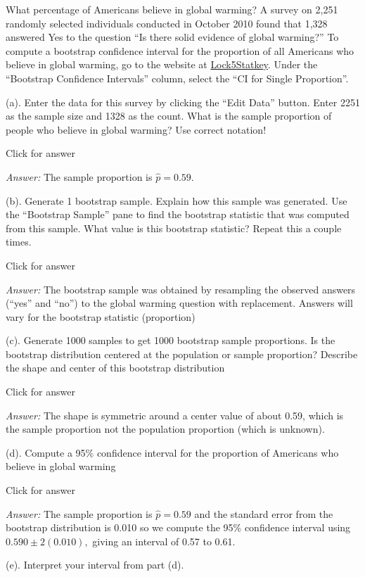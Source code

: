\documentclass[
]{book}
\begin{document}
What percentage of Americans believe in global warming? A survey on 2,251 randomly selected individuals
conducted in October 2010 found that 1,328 answered Yes to the question ``Is there solid evidence of global
warming?'' To compute a bootstrap confidence interval for the proportion of all Americans who believe in
global warming, go to the website at \href{http://www.lock5stat.com/StatKey/}{Lock5Statkey}. Under the ``Bootstrap Confidence Intervals'' column, select the ``CI for Single Proportion''.

(a). Enter the data for this survey by clicking the ``Edit Data'' button. Enter 2251 as the sample size and 1328 as the count. What is the sample proportion of people who believe in global warming? Use correct notation!

Click for answer

\emph{Answer:} The sample proportion is \(\hat{p} = 0.59\).

(b). Generate 1 bootstrap sample. Explain how this sample was generated. Use the ``Bootstrap Sample'' pane to find the bootstrap statistic that was computed from this sample. What value is this bootstrap statistic? Repeat this a couple times.

Click for answer

\emph{Answer:} The bootstrap sample was obtained by resampling the observed answers (``yes'' and ``no'') to the global warming question with replacement. Answers will vary for the bootstrap statistic (proportion)

(c). Generate 1000 samples to get 1000 bootstrap sample proportions. Is the bootstrap distribution centered at the population or sample proportion? Describe the shape and center of this bootstrap distribution

Click for answer

\emph{Answer:} The shape is symmetric around a center value of about 0.59, which is the sample proportion not the population proportion (which is unknown).

(d). Compute a 95\% confidence interval for the proportion of Americans who believe in global warming

Click for answer

\emph{Answer:} The sample proportion is \(\hat{p} = 0.59\) and the standard error from the bootstrap distribution is 0.010 so we compute the 95\% confidence interval using \(0.590 \pm 2(0.010),\) giving an interval of 0.57 to 0.61.

(e). Interpret your interval from part (d).
\end{document}
